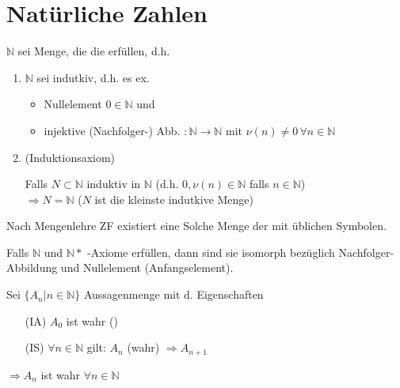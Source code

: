 \addtocounter{section}{1} %
\section{Natürliche Zahlen}
\begin{definition}
$\mathbb{N}$ sei Menge, die die  erfüllen, d.h.
\begin{enumerate}[label={P\arabic*)}]
	\item $\mathbb{N}$ sei indutkiv, d.h. es ex.
	\begin{itemize}
		\item Nullelement $0\in \mathbb{N}$ und
		\item injektive (Nachfolger-) Abb. $:\mathbb{N}\rightarrow\mathbb{N}$ mit $\nu(n)\neq 0\,\forall n\in \mathbb{N}$
	\end{itemize}
	\item (Induktionsaxiom)
	
	Falls $N\subset\mathbb{N}$ induktiv in $\mathbb{N}$ (d.h. $0,\nu(n)\in\mathbb{N}$ falls $n\in\mathbb{N}$)\\
	$\Rightarrow N=\mathbb{N}$ ($N$ ist die kleinste indutkive Menge)
\end{enumerate}

Nach Mengenlehre ZF existiert eine Solche Menge der  mit üblichen Symbolen.
\end{definition}

\begin{theorem}
	Falls $\mathbb{N}$ und $\mathbb{N}*$ -Axiome erfüllen, dann sind sie isomorph bezüglich Nachfolger-Abbildung und Nullelement (Anfangselement).
\end{theorem}

\begin{proposition} 
	Sei $\{A_n | n\in\mathbb{N}\}$ Aussagenmenge mit d. Eigenschaften
	\begin{itemize}
		\item[(IA)] $A_0$ ist wahr ()
		\item[(IS)] $\forall n\in\mathbb{N}$ gilt: $A_n$ (wahr) $\Rightarrow A_{n+1}$
	\end{itemize}
	$\Rightarrow A_n$ ist wahr $\forall n\in\mathbb{N}$
\end{proposition}

